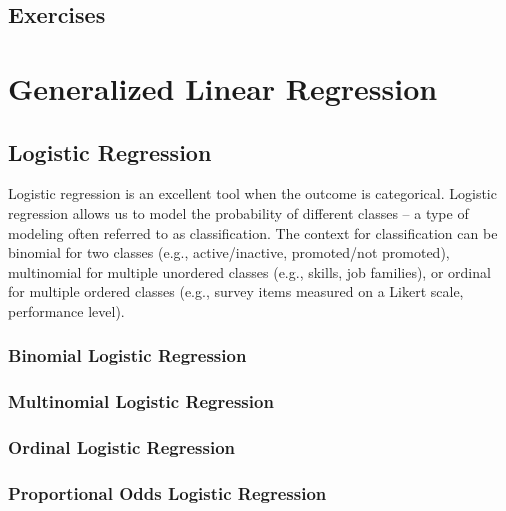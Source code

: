 \documentclass[]{book}
\begin{document}
\hypertarget{exercises-6}{%
\section{Exercises}\label{exercises-6}}

\hypertarget{glm}{%
\chapter{Generalized Linear Regression}\label{glm}}

\hypertarget{logistic-regression}{%
\section{Logistic Regression}\label{logistic-regression}}

Logistic regression is an excellent tool when the outcome is categorical. Logistic regression allows us to model the probability of different classes -- a type of modeling often referred to as classification. The context for classification can be binomial for two classes (e.g., active/inactive, promoted/not promoted), multinomial for multiple unordered classes (e.g., skills, job families), or ordinal for multiple ordered classes (e.g., survey items measured on a Likert scale, performance level).

\hypertarget{binomial-logistic-regression}{%
\subsection{Binomial Logistic Regression}\label{binomial-logistic-regression}}

\hypertarget{multinomial-logistic-regression}{%
\subsection{Multinomial Logistic Regression}\label{multinomial-logistic-regression}}

\hypertarget{ordinal-logistic-regression}{%
\subsection{Ordinal Logistic Regression}\label{ordinal-logistic-regression}}

\hypertarget{proportional-odds-logistic-regression}{%
\subsection{Proportional Odds Logistic Regression}\label{proportional-odds-logistic-regression}}
\end{document}
